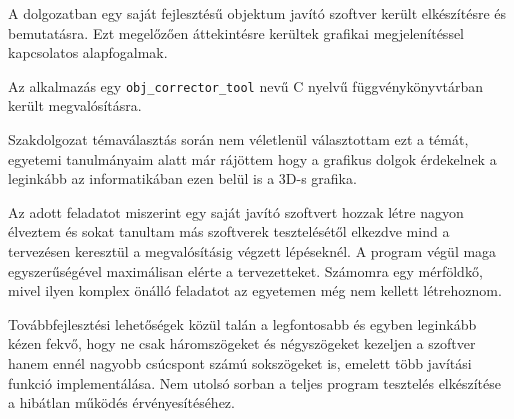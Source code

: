 A dolgozatban egy saját fejlesztésű objektum javító szoftver került elkészítésre és bemutatásra. Ezt megelőzően áttekintésre kerültek grafikai megjelenítéssel kapcsolatos alapfogalmak.

Az alkalmazás egy \texttt{obj\_corrector\_tool} nevű C nyelvű függvénykönyvtárban került megvalósításra.

Szakdolgozat témaválasztás során nem véletlenül választottam ezt a témát, egyetemi tanulmányaim alatt már rájöttem hogy a grafikus dolgok érdekelnek a leginkább az informatikában ezen belül is a 3D-s grafika.

Az adott feladatot miszerint egy saját javító szoftvert hozzak létre nagyon élveztem és sokat tanultam más szoftverek tesztelésétől elkezdve mind a tervezésen keresztül a megvalósításig végzett lépéseknél.
A program végül maga egyszerűségével maximálisan elérte a tervezetteket. Számomra egy mérföldkő, mivel ilyen komplex önálló feladatot az egyetemen még nem kellett létrehoznom.

Továbbfejlesztési lehetőségek közül talán a legfontosabb és egyben leginkább kézen fekvő, hogy ne csak háromszögeket és négyszögeket kezeljen a szoftver hanem ennél nagyobb csúcspont számú sokszögeket is, emelett több javítási funkció implementálása. Nem utolsó sorban a teljes program tesztelés elkészítése a hibátlan működés érvényesítéséhez.